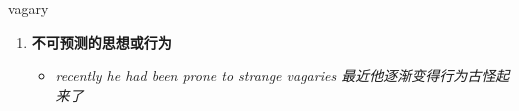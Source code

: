 
\begin{frame}
{\huge vagary}
\begin{center}
\begin{enumerate}\Large
  \item \textbf{不可预测的思想或行为}
  \begin{itemize}
    \item \em{\Large{recently he had been prone to strange vagaries 最近他逐渐变得行为古怪起来了}}
  \end{itemize}
\end{enumerate}
\end{center}
\end{frame}

